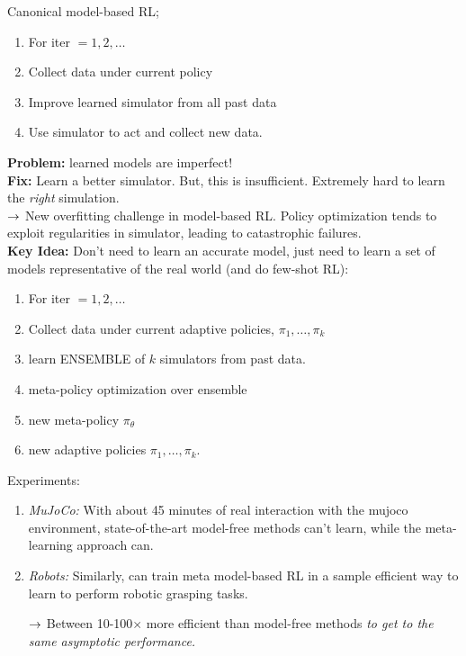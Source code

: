 
Canonical model-based RL;
\begin{enumerate}
    \item For iter $ = 1, 2, \ldots$
    \item \hspace{6mm} Collect data under current policy
    \item \hspace{6mm} Improve learned simulator from all past data
    \item \hspace{6mm} Use simulator to act and collect new data.
\end{enumerate}

{\bf Problem:} learned models are imperfect!  \\

{\bf Fix:} Learn a better simulator. But, this is insufficient. Extremely hard to learn the {\it right} simulation. \\

$\rightarrow$ New overfitting challenge in model-based RL. Policy optimization tends to exploit regularities in simulator, leading to catastrophic failures. \\

{\bf Key Idea:} Don't need to learn an accurate model, just need to learn a set of models representative of the real world (and do few-shot RL):
\begin{enumerate}
    \item For iter $ = 1, 2, \ldots$
    \item \hspace{6mm} Collect data under current adaptive policies, $\pi_1, \ldots, \pi_k$
    \item \hspace{6mm} learn ENSEMBLE of $k$ simulators from past data.
    \item \hspace{6mm} meta-policy optimization over ensemble
    \item \hspace{12mm} new meta-policy $\pi_\theta$
    \item \hspace{12mm} new adaptive policies $\pi_1, \ldots, \pi_k$.
\end{enumerate}

Experiments: 
\begin{enumerate}
    \item {\it MuJoCo:} With about 45 minutes of real interaction with the mujoco environment, state-of-the-art model-free methods can't learn, while the meta-learning approach can.
    \item {\it Robots:} Similarly, can train meta model-based RL in a sample efficient way to learn to perform robotic grasping tasks.
    
    $\rightarrow$ Between 10-100$\times$ more efficient than model-free methods {\it to get to the same asymptotic performance.}
\end{enumerate}

